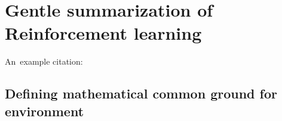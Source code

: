 \chapter{Gentle summarization of Reinforcement learning}

An~example citation: \cite{Andel07}

\section{Defining mathematical common ground for environment }

